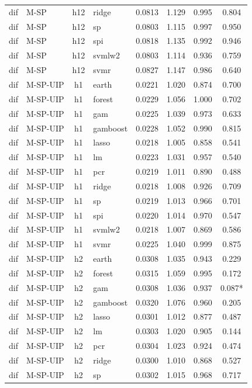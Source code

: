 \begin{ThreePartTable}
\begin{longtable}[t]{llclcccc}
dif & M-SP & h12 & ridge & 0.0813 & 1.129 & 0.995 & 0.804\\
dif & M-SP & h12 & sp & 0.0803 & 1.115 & 0.997 & 0.950\\
dif & M-SP & h12 & spi & 0.0818 & 1.135 & 0.992 & 0.946\\
dif & M-SP & h12 & svmlw2 & 0.0803 & 1.114 & 0.936 & 0.759\\
dif & M-SP & h12 & svmr & 0.0827 & 1.147 & 0.986 & 0.640\\
\addlinespace
dif & M-SP-UIP & h1 & earth & 0.0221 & 1.020 & 0.874 & 0.700\\
dif & M-SP-UIP & h1 & forest & 0.0229 & 1.056 & 1.000 & 0.702\\
dif & M-SP-UIP & h1 & gam & 0.0225 & 1.039 & 0.973 & 0.633\\
dif & M-SP-UIP & h1 & gamboost & 0.0228 & 1.052 & 0.990 & 0.815\\
dif & M-SP-UIP & h1 & lasso & 0.0218 & 1.005 & 0.858 & 0.541\\
dif & M-SP-UIP & h1 & lm & 0.0223 & 1.031 & 0.957 & 0.540\\
dif & M-SP-UIP & h1 & pcr & 0.0219 & 1.011 & 0.890 & 0.488\\
dif & M-SP-UIP & h1 & ridge & 0.0218 & 1.008 & 0.926 & 0.709\\
dif & M-SP-UIP & h1 & sp & 0.0219 & 1.013 & 0.966 & 0.701\\
dif & M-SP-UIP & h1 & spi & 0.0220 & 1.014 & 0.970 & 0.547\\
dif & M-SP-UIP & h1 & svmlw2 & 0.0218 & 1.007 & 0.869 & 0.586\\
dif & M-SP-UIP & h1 & svmr & 0.0225 & 1.040 & 0.999 & 0.875\\
\addlinespace
dif & M-SP-UIP & h2 & earth & 0.0308 & 1.035 & 0.943 & 0.229\\
dif & M-SP-UIP & h2 & forest & 0.0315 & 1.059 & 0.995 & 0.172\\
dif & M-SP-UIP & h2 & gam & 0.0308 & 1.036 & 0.937 & 0.087*\\
dif & M-SP-UIP & h2 & gamboost & 0.0320 & 1.076 & 0.960 & 0.205\\
dif & M-SP-UIP & h2 & lasso & 0.0301 & 1.012 & 0.877 & 0.487\\
dif & M-SP-UIP & h2 & lm & 0.0303 & 1.020 & 0.905 & 0.144\\
dif & M-SP-UIP & h2 & pcr & 0.0304 & 1.023 & 0.924 & 0.474\\
dif & M-SP-UIP & h2 & ridge & 0.0300 & 1.010 & 0.868 & 0.527\\
dif & M-SP-UIP & h2 & sp & 0.0302 & 1.015 & 0.968 & 0.717\\

\end{longtable}
\end{ThreePartTable}
